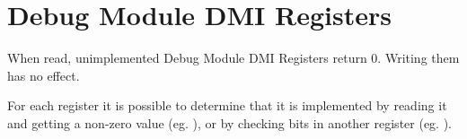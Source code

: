 \section{Debug Module DMI Registers} \label{dmdebbus}

When read, unimplemented Debug Module DMI Registers return 0. Writing them has
no effect.

For each register it is possible to determine that it is implemented by reading
it and getting a non-zero value (eg. \Rsbcs), or by checking bits in another
register (eg. \Fprogbufsize).


